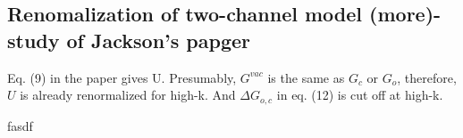\subsection{Renomalization of two-channel model (more)-study of Jackson's papger\cite{JacksonNarrow}}
Eq. (9) in the paper \cite{JacksonNarrow} gives U.  Presumably,  $G^{vac}$ is the same as $G_c$ or $G_o$, therefore, $U$ is already renormalized for high-k. And $\Delta{G_{o,c}}$ in eq. (12) is cut off at high-k. 

fasdf